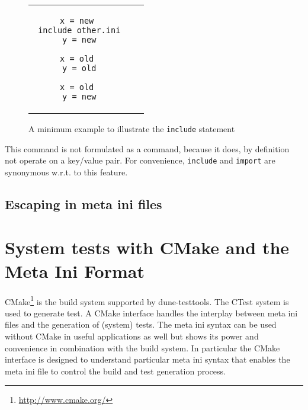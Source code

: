 \documentclass[11pt]{article}
\begin{document}
\begin{figure}
\begin{tabular}{ccc}
\begin{minipage}{.4\linewidth}
\begin{lstlisting}[title={include.ini}]
 x = new
 include other.ini
 y = new
\end{lstlisting}
\end{minipage}

\begin{minipage}{.3\linewidth}
\begin{lstlisting}[title={other.ini}]
 x = old
 y = old
\end{lstlisting}
\end{minipage}

\begin{minipage}{.3\linewidth}
\begin{lstlisting}[title={Result}]
 x = old
 y = new
\end{lstlisting}
\end{minipage}
\end{tabular}
\caption{A minimum example to illustrate the \lstinline!include! statement}
\label{fig:include}
\end{figure}

This command is not formulated as a command, because it does, by definition not operate on a key/value pair. For convenience, \lstinline!include! and \lstinline!import! are synonymous w.r.t. to this feature.

\subsection{Escaping in meta ini files}

\section{System tests with CMake and the Meta Ini Format}
\label{sec:systemtest}
CMake\footnote{\url{http://www.cmake.org/}} is the build system supported by dune-testtools. The CTest system is used to generate test.
A CMake interface handles the interplay between
meta ini files and the generation of (system) tests. The meta ini syntax can be used without CMake in useful applications as well but
shows its power and convenience in combination with the build system. In particular the CMake interface is designed to understand particular
meta ini syntax that enables the meta ini file to control the build and test generation process.
\end{document}
